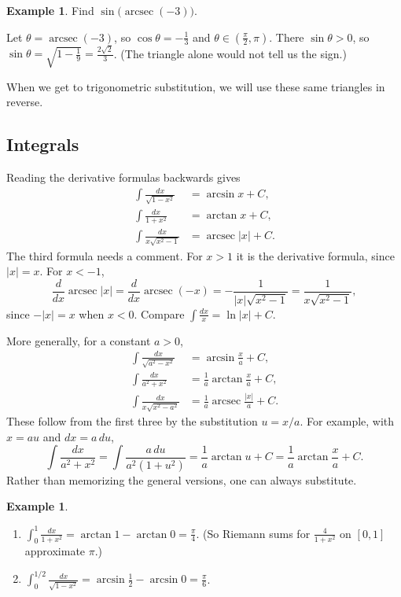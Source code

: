 \documentclass[12pt,letterpaper]{article}
\theoremstyle{definition}
\newtheorem{example}[theorem]{Example}
\DeclareMathOperator{\arcsec}{arcsec}
\begin{document}
\begin{example}
  Find $\sin\bigl(\arcsec(-3)\bigr)$.

  Let $\theta=\arcsec(-3)$, so $\cos\theta=-\frac13$ and
  $\theta\in(\frac\pi2,\pi)$. There $\sin\theta>0$, so
  $\sin\theta=\sqrt{1-\frac19}=\frac{2\sqrt2}{3}$. (The triangle alone would
  not tell us the sign.)
\end{example}

When we get to trigonometric substitution, we will use these same triangles
in reverse.

\subsection{Integrals}

Reading the derivative formulas backwards gives
\[
  \boxed{\;
  \begin{aligned}
    \int\frac{dx}{\sqrt{1-x^2}}&=\arcsin x+C,\\
    \int\frac{dx}{1+x^2}&=\arctan x+C,\\
    \int\frac{dx}{x\sqrt{x^2-1}}&=\arcsec|x|+C.
  \end{aligned}
  \;}
\]
The third formula needs a comment. For $x>1$ it is the derivative formula,
since $|x|=x$. For $x<-1$,
\[
  \frac{d}{dx}\arcsec|x|=\frac{d}{dx}\arcsec(-x)
    =-\frac{1}{|x|\sqrt{x^2-1}}=\frac{1}{x\sqrt{x^2-1}},
\]
since $-|x|=x$ when $x<0$. Compare $\int\frac{dx}{x}=\ln|x|+C$.

More generally, for a constant $a>0$,
\[
  \boxed{\;
  \begin{aligned}
    \int\frac{dx}{\sqrt{a^2-x^2}}&=\arcsin\frac{x}{a}+C,\\
    \int\frac{dx}{a^2+x^2}&=\frac1a\arctan\frac{x}{a}+C,\\
    \int\frac{dx}{x\sqrt{x^2-a^2}}&=\frac1a\arcsec\frac{|x|}{a}+C.
  \end{aligned}
  \;}
\]
These follow from the first three by the substitution $u=x/a$. For example,
with $x=au$ and $dx=a\,du$,
\[
  \int\frac{dx}{a^2+x^2}=\int\frac{a\,du}{a^2(1+u^2)}
    =\frac1a\arctan u+C=\frac1a\arctan\frac xa+C.
\]
Rather than memorizing the general versions, one can always substitute.

\begin{example}
  \begin{enumerate}[label=(\alph*)]
    \item $\displaystyle\int_0^1\frac{dx}{1+x^2}=\arctan1-\arctan0
      =\frac\pi4$.
      (So Riemann sums for $\frac{4}{1+x^2}$ on $[0,1]$ approximate $\pi$.)
    \item $\displaystyle\int_0^{1/2}\frac{dx}{\sqrt{1-x^2}}
      =\arcsin\frac12-\arcsin0=\frac\pi6$.
  \end{enumerate}
\end{example}
\end{document}
